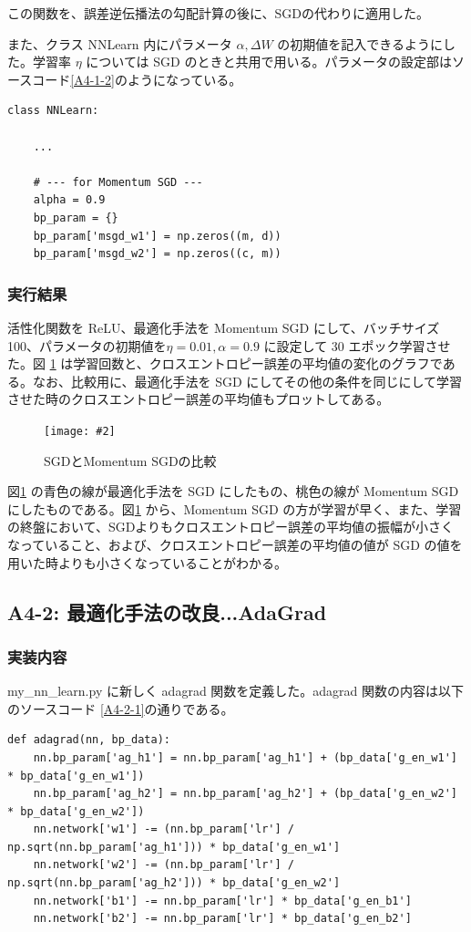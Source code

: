 \documentclass[a4paper,dvipdfmx]{jsarticle}
\newcommand{\image}[3]{
    \begin{figure}[H]
        \begin{center}
        \texttt{[image: \#2]}
        \end{center}
        \caption{#1}
        \label{#3}
    \end{figure}
}
\begin{document}
この関数を、誤差逆伝播法の勾配計算の後に、SGDの代わりに適用した。

また、クラス NNLearn 内にパラメータ $\alpha, \Delta W$ の初期値を記入できるようにした。学習率 $\eta$ については SGD のときと共用で用いる。パラメータの設定部はソースコード\ref{A4-1-2}のようになっている。
\begin{lstlisting}[caption="Momentum SGDのパラメータ設定部",label=A4-1-2]
class NNLearn:

	...
	
    # --- for Momentum SGD ---
    alpha = 0.9
    bp_param = {}
    bp_param['msgd_w1'] = np.zeros((m, d))
    bp_param['msgd_w2'] = np.zeros((c, m))
\end{lstlisting}
\subsubsection*{実行結果}

活性化関数を ReLU、最適化手法を Momentum SGD にして、バッチサイズ 100、パラメータの初期値を$\eta = 0.01, \alpha = 0.9$ に設定して 30 エポック学習させた。図 \ref{fig-A4-1-1} は学習回数と、クロスエントロピー誤差の平均値の変化のグラフである。なお、比較用に、最適化手法を SGD にしてその他の条件を同じにして学習させた時のクロスエントロピー誤差の平均値もプロットしてある。

\image{SGDとMomentum SGDの比較}{report_a4-1.png}{fig-A4-1-1}

図\ref{fig-A4-1-1} の青色の線が最適化手法を SGD にしたもの、桃色の線が Momentum SGD にしたものである。図\ref{fig-A4-1-1} から、Momentum SGD の方が学習が早く、また、学習の終盤において、SGDよりもクロスエントロピー誤差の平均値の振幅が小さくなっていること、および、クロスエントロピー誤差の平均値の値が SGD の値を用いた時よりも小さくなっていることがわかる。

\subsection*{A4-2: 最適化手法の改良...AdaGrad}

\subsubsection*{実装内容}
my\_nn\_learn.py に新しく adagrad 関数を定義した。adagrad 関数の内容は以下のソースコード \ref{A4-2-1}の通りである。
\begin{lstlisting}[caption="AdaGrad",label=A4-2-1]
def adagrad(nn, bp_data):
    nn.bp_param['ag_h1'] = nn.bp_param['ag_h1'] + (bp_data['g_en_w1'] * bp_data['g_en_w1'])
    nn.bp_param['ag_h2'] = nn.bp_param['ag_h2'] + (bp_data['g_en_w2'] * bp_data['g_en_w2'])
    nn.network['w1'] -= (nn.bp_param['lr'] / np.sqrt(nn.bp_param['ag_h1'])) * bp_data['g_en_w1']
    nn.network['w2'] -= (nn.bp_param['lr'] / np.sqrt(nn.bp_param['ag_h2'])) * bp_data['g_en_w2']
    nn.network['b1'] -= nn.bp_param['lr'] * bp_data['g_en_b1']
    nn.network['b2'] -= nn.bp_param['lr'] * bp_data['g_en_b2']
\end{lstlisting}
\end{document}
